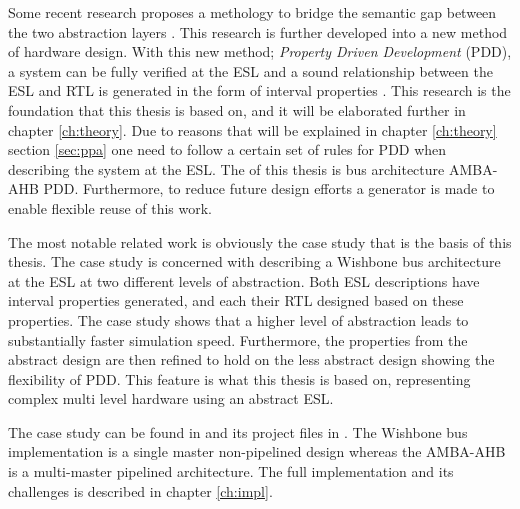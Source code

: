 Some recent research proposes a methology to bridge the semantic gap between the two abstraction layers \cite{2014-UrdahlStoffel.etal}. This research is further developed into a new method of hardware design. With this new method; \textit{Property Driven Development} (PDD), a system can be fully verified at the ESL and a sound relationship between the ESL and RTL is generated in the form of interval properties \cite{pddref}. This research is the foundation that this thesis is based on, and it will be elaborated further in chapter \ref{ch:theory}. Due to reasons that will be explained in chapter \ref{ch:theory} section \ref{sec:ppa} one need to follow a certain set of rules for PDD when describing the system at the ESL.  The    of this thesis is  bus  architecture AMBA-AHB  PDD. Furthermore, to reduce future design efforts a generator is made to enable flexible reuse of this work. 

The most notable related work is obviously the case study that is the basis of this thesis. The case study is concerned with describing a Wishbone bus architecture at the ESL at two different levels of abstraction. Both ESL descriptions have interval properties generated, and each their RTL designed based on these properties. The case study shows that a higher level of abstraction leads to substantially faster simulation speed. Furthermore, the properties from the abstract design are then refined to hold on the less abstract design showing the flexibility of PDD. This feature is what this thesis is based on, representing complex multi level hardware using an abstract ESL.

 The case study can be found in \cite{pddref} and its project files in \cite{descam}. The Wishbone bus implementation is a single master non-pipelined design whereas the AMBA-AHB is a multi-master pipelined architecture. The full implementation and its challenges is described in chapter \ref{ch:impl}.          





 


